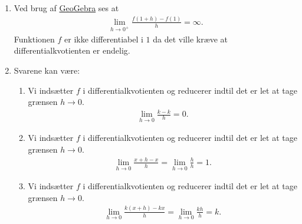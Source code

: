 \begin{enumerate}
	
	\item Ved brug af \href{https://www.geogebra.org/m/eTmzBFEq}{GeoGebra} ses at
	\begin{align*}
	\lim_{h\to 0^+} \frac{f(1+h)-f(1)}{h}= \infty.
	\end{align*}
	Funktionen $f$ er ikke differentiabel i $1$ da det ville kræve at differentialkvotienten er endelig.
	
	\item Svarene kan være:
	\begin{enumerate}
		\item Vi indsætter $f$ i differentialkvotienten og reducerer indtil det er let at tage grænsen $h\to 0$.
		\begin{align*}
		\lim_{h\to 0}\frac{k-k}{h}=0.
		\end{align*}
		\item Vi indsætter $f$ i differentialkvotienten og reducerer indtil det er let at tage grænsen $h\to 0$.
		\begin{align*}
		\lim_{h\to 0}\frac{x+h-x}{h}=\lim_{h\to 0}\frac{h}{h}=1.
		\end{align*}
		\item Vi indsætter $f$ i differentialkvotienten og reducerer indtil det er let at tage grænsen $h\to 0$.
		\begin{align*}
		\lim_{h\to 0}\frac{k(x+h)-kx}{h}=\lim_{h\to 0}\frac{kh}{h}=k.
		\end{align*}
	\end{enumerate}
	

\end{enumerate}

